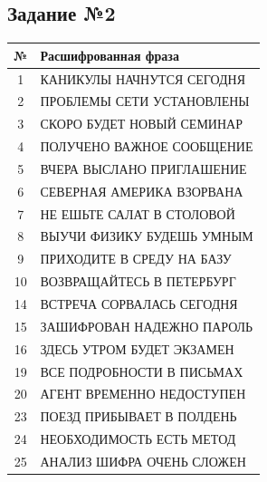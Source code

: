 \documentclass[a4paper,12pt]{article}
\begin{document}
\subsection*{Задание №2}

\begin{center}
  \begin{tabular}{|c|p{10cm}|}
    \hline
    № & Расшифрованная фраза \\
    \hline
    1 & КАНИКУЛЫ НАЧНУТСЯ СЕГОДНЯ \\
    \hline
    2 & ПРОБЛЕМЫ СЕТИ УСТАНОВЛЕНЫ \\
    \hline
    3 & СКОРО БУДЕТ НОВЫЙ СЕМИНАР \\
    \hline
    4 & ПОЛУЧЕНО ВАЖНОЕ СООБЩЕНИЕ \\
    \hline
    5 & ВЧЕРА ВЫСЛАНО ПРИГЛАШЕНИЕ \\
    \hline
    6 & СЕВЕРНАЯ АМЕРИКА ВЗОРВАНА \\
    \hline
    7 & НЕ ЕШЬТЕ САЛАТ В СТОЛОВОЙ \\
    \hline
    8 & ВЫУЧИ ФИЗИКУ БУДЕШЬ УМНЫМ \\
    \hline
    9 & ПРИХОДИТЕ В СРЕДУ НА БАЗУ \\
    \hline
    10 & ВОЗВРАЩАЙТЕСЬ В ПЕТЕРБУРГ \\
    \hline
    14 & ВСТРЕЧА СОРВАЛАСЬ СЕГОДНЯ \\
    \hline
    15 & ЗАШИФРОВАН НАДЕЖНО ПАРОЛЬ \\
    \hline
    16 & ЗДЕСЬ УТРОМ БУДЕТ ЭКЗАМЕН \\
    \hline
    19 & ВСЕ ПОДРОБНОСТИ В ПИСЬМАХ \\
    \hline
    20 & АГЕНТ ВРЕМЕННО НЕДОСТУПЕН \\
    \hline
    23 & ПОЕЗД ПРИБЫВАЕТ В ПОЛДЕНЬ \\
    \hline
    24 & НЕОБХОДИМОСТЬ ЕСТЬ МЕТОД \\
    \hline
    25 & АНАЛИЗ ШИФРА ОЧЕНЬ СЛОЖЕН \\
    \hline
  \end{tabular}
\end{center}
\end{document}
